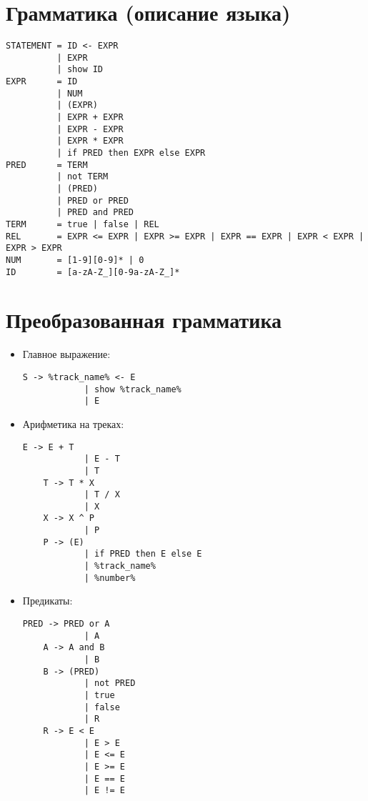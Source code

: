 \newpage
\section*{Грамматика (описание языка)}
\begin{lstlisting}
STATEMENT = ID <- EXPR 
          | EXPR
          | show ID
EXPR      = ID
          | NUM
          | (EXPR)
          | EXPR + EXPR
          | EXPR - EXPR
          | EXPR * EXPR
          | if PRED then EXPR else EXPR
PRED      = TERM
          | not TERM
          | (PRED)
          | PRED or PRED
          | PRED and PRED
TERM      = true | false | REL
REL       = EXPR <= EXPR | EXPR >= EXPR | EXPR == EXPR | EXPR < EXPR | EXPR > EXPR
NUM       = [1-9][0-9]* | 0
ID        = [a-zA-Z_][0-9a-zA-Z_]*
\end{lstlisting}

\newpage
\section*{Преобразованная грамматика}

\begin{itemize}
\item Главное выражение:
\begin{lstlisting}[style=nonumbers]
	S -> %track_name% <- E
			| show %track_name%
			| E
\end{lstlisting}

\item Арифметика на треках:
\begin{lstlisting}[style=nonumbers]
	E -> E + T
			| E - T
			| T
	T -> T * X
			| T / X
			| X
	X -> X ^ P
			| P
	P -> (E) 
			| if PRED then E else E
			| %track_name% 
			| %number%
\end{lstlisting}

\item Предикаты:
\begin{lstlisting}[style=nonumbers]
	PRED -> PRED or A
			| A
	A -> A and B
			| B
	B -> (PRED)
			| not PRED
			| true
			| false
			| R
	R -> E < E
			| E > E
			| E <= E
			| E >= E
			| E == E
			| E != E
\end{lstlisting}

\end{itemize}

\newpage
